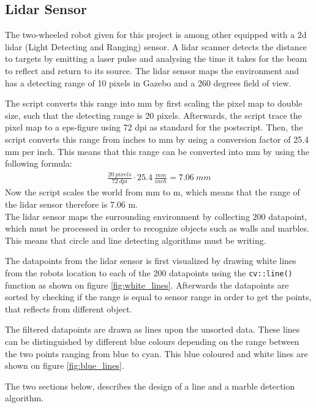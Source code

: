 \documentclass[../Head/Main.tex]{subfiles}
\begin{document}
\subsection{Lidar Sensor}
The two-wheeled robot given for this project is among other equipped with a 2d lidar (Light Detecting and Ranging) sensor. A lidar scanner detects the distance to targets by emitting a laser pulse and analysing the time it takes for the beam to reflect and return to its source. The lidar sensor maps the environment and has a detecting range of 10 pixels in Gazebo and a 260 degrees field of view. \par
The script converts this range into mm by first scaling the pixel map to double size, such that the detecting range is 20 pixels. Afterwards, the script trace the pixel map to a eps-figure using 72 dpi as standard for the postscript. Then, the script converts this range from inches to mm by using a conversion factor of 25.4 mm per inch. This means that this range can be converted into mm by using the following formula:
\begin{align*}
\frac{20~pixels}{72~dpi}\cdot 25.4~\frac{mm}{inch} = 7.06~mm
\end{align*}
Now the script scales the world from mm to m, which means that the range of the lidar sensor therefore is 7.06 m.\\
The lidar sensor maps the surrounding environment by collecting 200 datapoint, which must be processed in order to recognize objects such as walls and marbles. This means that circle and line detecting algorithms must be writing. \par
The datapoints from the lidar sensor is first visualized by drawing white lines from the robots location to each of the 200 datapoints using the \texttt{cv::line()} function as shown on figure \ref{fig:white_lines}. Afterwards the datapoints are sorted by checking if the range is equal to sensor range in order to get the points, that reflects from different object.\par
The filtered datapoints are drawn as lines upon the unsorted data. These lines can be distinguished by different blue colours depending on the range between the two points ranging from blue to cyan. This blue coloured and white lines are shown on figure \ref{fig:blue_lines}.

The two sections below, describes the design of a line and a marble detection algorithm.


\end{document}
